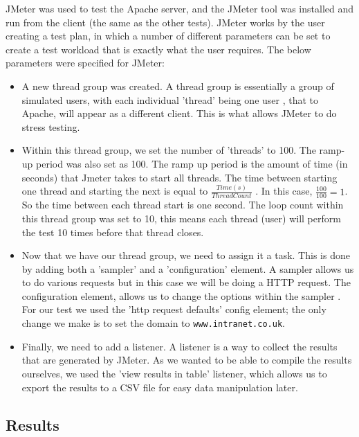 JMeter was used to test the Apache server, and the JMeter tool was installed and run from the client (the same as the other tests). JMeter works by the user creating a test plan\citep{JMeter3}, in which a number of different parameters can be set to create a test workload that is exactly what the user requires. The below parameters were specified for JMeter:
\begin{itemize}
  \item A new thread group was created. A thread group is essentially a group of simulated users, with each individual 'thread' being one user \citep[3.1 Thread Group]{JMeter3}, that to Apache, will appear as a different client. This is what allows JMeter to do stress testing.
  \item Within this thread group, we set the number of 'threads' to 100. The ramp-up period was also set as 100. The ramp up period is the amount of time (in seconds) that Jmeter takes to start all threads\citep[3.1 Thread Group]{JMeter3}. The time between starting one thread and starting the next is equal to \(\frac{Time(s)}{ThreadCount}\) \citep[3.1 Thread Group]{JMeter3}. In this case, \(\frac{100}{100}=1\). So the time between each thread start is one second. The loop count within this thread group was set to 10, this means each thread (user) will perform the test 10 times before that thread closes.
  \item Now that we have our thread group, we need to assign it a task. This is done by adding both a 'sampler' and a 'configuration' element. A sampler allows us to do various requests\citep[3.2.1 Samplers]{JMeter3} but in this case we will be doing a HTTP request. The configuration element, allows us to change the options within the sampler \citep[3.6 Configuration Elements]{JMeter3}. For our test we used the 'http request defaults' config element; the only change we make is to set the domain to \texttt{www.intranet.co.uk}.
  \item Finally, we need to add a listener. A listener is a way to collect the results that are generated by JMeter\citep[3.3 Listeners]{JMeter3}. As we wanted to be able to compile the results ourselves, we used the 'view results in table' listener\citep[18.3 Listeners, View Results in Table]{JMeter18}, which allows us to export the results to a CSV file for easy data manipulation later.
\end{itemize}

\subsection{Results}
